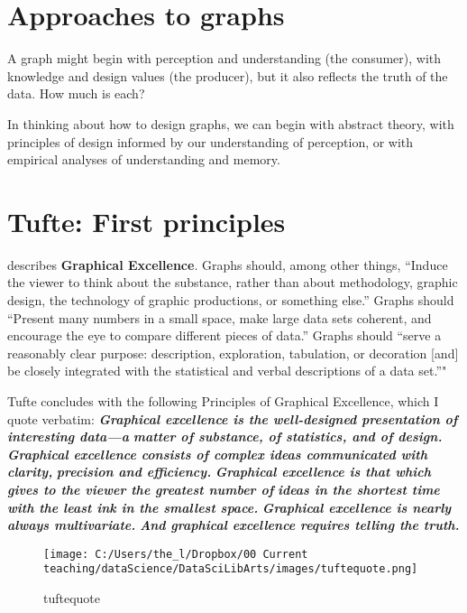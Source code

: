 \documentclass[]{book}
\theoremstyle{definition}
\theoremstyle{definition}
\theoremstyle{definition}
\theoremstyle{remark}
\begin{document}
\section{Approaches to graphs}\label{approaches-to-graphs}

A graph might begin with perception and understanding (the consumer),
with knowledge and design values (the producer), but it also reflects
the truth of the data. How much is each?

In thinking about how to design graphs, we can begin with abstract
theory, with principles of design informed by our understanding of
perception, or with empirical analyses of understanding and memory.

\section{Tufte: First principles}\label{tufte-first-principles}

\citet{tufte2001visual} describes \textbf{Graphical Excellence}. Graphs
should, among other things, ``Induce the viewer to think about the
substance, rather than about methodology, graphic design, the technology
of graphic productions, or something else.'' Graphs should ``Present
many numbers in a small space, make large data sets coherent, and
encourage the eye to compare different pieces of data.'' Graphs should
``serve a reasonably clear purpose: description, exploration,
tabulation, or decoration {[}and{]} be closely integrated with the
statistical and verbal descriptions of a data set.''"

Tufte concludes with the following Principles of Graphical Excellence,
which I quote verbatim: \textbf{\emph{Graphical excellence is the
well-designed presentation of interesting data---a}}
\textbf{\emph{matter of substance, of statistics, and of design.}}
\textbf{\emph{Graphical excellence consists of complex ideas
communicated with clarity,}} \textbf{\emph{precision and efficiency.}}
\textbf{\emph{Graphical excellence is that which gives to the viewer the
greatest number of}} \textbf{\emph{ideas in the shortest time with the
least ink in the smallest space.}} \textbf{\emph{Graphical excellence is
nearly always multivariate.}} \textbf{\emph{And graphical excellence
requires telling the truth.}}

\begin{figure}
\centering
\texttt{[image: C:/Users/the\_l/Dropbox/00 Current teaching/dataScience/DataSciLibArts/images/tuftequote.png]}
\caption{tuftequote}
\end{figure}
\end{document}
